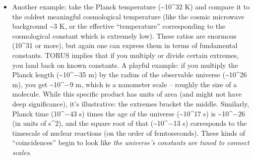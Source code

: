 \begin{itemize}
{  scale multiply or relate to give moderate values}. Consider the age of
  the universe versus the Planck time:
  T\textless{}sub\textgreater{}U\textless{}/sub\textgreater{}/t\textless{}sub\textgreater{}P\textless{}/sub\textgreater{}
  \textasciitilde{} 8×10\^{}60. If this were just a random huge number,
  one might shrug. But TORUS factorizes this: 8×10\^{}60 ≈ (10\^{}2) ×
  (10\^{}38) × (10\^{}20)​. Each factor has a physical meaning: 10\^{}2
  is \textasciitilde{}137, close to 1/α (the 0D coupling's inverse)​;
  10\^{}38 is in the ballpark of the ratio of electromagnetic to
  gravitational coupling for typical particles (since gravity is
  \textasciitilde{}10\^{}38 times weaker)​; 10\^{}20 might relate to
  number of particles or entropy in a large system. The exact
  interpretation can vary, but the point remains -- these large
  dimensionless numbers decompose into \textbf{products of fundamental
  ratios} rather than being sui generis. TORUS thereby
  \textbf{demystifies large numbers}: they're harmonics of the smaller
  numbers. In music, this is like hearing a very low bass note and
  realizing it's actually a combination of higher-frequency harmonics
  you already know. By showing that a huge number like 10\^{}60 can come
  from α\^{}−1 (\textasciitilde{}10\^{}2) times other known quantities,
  TORUS suggests the cosmic scale is in resonance with the quantum
  scales​.
\item
  Another example: take the Planck temperature
  (\textasciitilde{}10\^{}32 K) and compare it to the coldest meaningful
  cosmological temperature (like the cosmic microwave background
  \textasciitilde{}3 K, or the effective ``temperature'' corresponding
  to the cosmological constant which is extremely low). These ratios are
  enormous (10\^{}31 or more), but again one can express them in terms
  of fundamental constants. TORUS implies that if you multiply or divide
  certain extremes, you land back on known constants. A playful example:
  if you multiply the Planck length (\textasciitilde{}10\^{}−35 m) by
  the radius of the observable universe (\textasciitilde{}10\^{}26 m),
  you get \textasciitilde{}10\^{}−9 m, which is a nanometer scale --
  roughly the size of a molecule. While this specific product has units
  of area (and might not have deep significance), it's illustrative: the
  extremes bracket the middle. Similarly, Planck time (10\^{}−43 s)
  times the age of the universe (\textasciitilde{}10\^{}17 s) is
  \textasciitilde{}10\^{}−26 (in units of s\^{}2), and the square root
  of that (\textasciitilde{}10\^{}−13 s) corresponds to the timescale of
  nuclear reactions (on the order of femtoseconds). These kinds of
  ``coincidences'' begin to look like \emph{the universe's constants are
  tuned to connect scales}.
\end{itemize}


